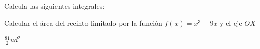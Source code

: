 \documentclass[addpoints,spanish, 12pt,a4paper]{exam}
\begin{document}
\begin{questions}
\question Calcula las siguientes integrales:

\question[2]   Calcular el área del recinto limitado por la función $f(x)=x^3-9x$ y el eje $OX$
\begin{solution}
    $\frac{81}{2}ud^2$
\end{solution}




\end{questions}
\end{document}
